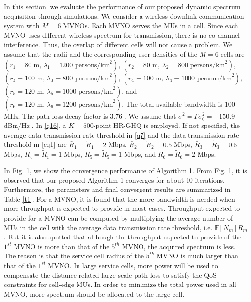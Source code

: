 \documentclass[journal]{IEEEtran}
\begin{document}
In this section, we evaluate the performance of our proposed dynamic spectrum acquisition through simulations. We consider a wireless downlink communication system with $M=6$ MVNOs. Each MVNO serves the MUs in a cell. Since each MVNO uses different wireless spectrum for transmission, there is no co-channel interference. Thus, the overlap of different cells will not cause a problem. We assume that the radii and the corresponding user densities of the $M=6$ cells are $(r_1 = 80\mbox{ m, }\lambda_1 = 1200\mbox{ persons/km}^2)$, $(r_2 = 80\mbox{ m, }\lambda_2 = 800\mbox{ persons/km}^2)$, $(r_3 = 100\mbox{ m, }\lambda_3 = 800\mbox{ persons/km}^2)$, $(r_4 = 100\mbox{ m, }\lambda_4 = 1000\mbox{ persons/km}^2)$, $(r_5 = 120\mbox{ m, }\lambda_5 = 1000\mbox{ persons/km}^2)$, and $(r_6 = 120\mbox{ m, }\lambda_6 = 1200\mbox{ persons/km}^2)$. The total available bandwidth is 100 MHz. The path-loss decay factor is 3.76 \cite{3GPP2}. We assume that $\sigma^2=\Gamma\sigma_0^2=-150.9$ dBm/Hz \cite{3GPP2}. In \eqref{q16}, a $K=500$-point HR-GHQ is employed. If not specified, the average data transmission rate threshold in \eqref{q7} and the data transmission rate threshold in \eqref{cq1} are $\bar{R}_1 =\tilde{R}_1=2$ Mbps, $\bar{R}_2 =\tilde{R}_2=0.5$ Mbps, $\bar{R}_3=\tilde{R}_3=0.5$ Mbps, $\bar{R}_4 =\tilde{R}_4=1$ Mbps, $\bar{R}_5=\tilde{R}_5=1$ Mbps, and $\bar{R}_6 =\tilde{R}_6=2$ Mbps.

In Fig. 1, we show the convergence performance of Algorithm 1.  From Fig. 1, it is observed that our proposed Algorithm 1 converges for about 10 iterations. Furthermore,{ \color{red} the parameters and final convergent results are summarized in Table \ref{t1}. For a MVNO,  it is found that the more bandwidth is needed when more throughput is expected to provide in most cases. Throughput expected to provide for a MVNO can be computed by multiplying the average number of MUs in the cell with the average data transmission rate threshold, i.e. $\mathbb{E}[N_m]\bar{R}_m$. But it is also spotted that although the throughput expected to provide of the $ 1^{st}$ MVNO is more than that of the $ 5^{th} $ MVNO, the acquired spectrum is less. The reason is that the service cell radius of the $ 5^{th} $ MVNO is much larger than that of the $ 1^{st}$ MVNO. In large service cells, more power will be used to compensate the distance-related large-scale path-loss to satisfy the QoS constraints for cell-edge MUs. In order to minimize the total power used in all MVNO, more spectrum should be allocated to the large cell.}
\end{document}

